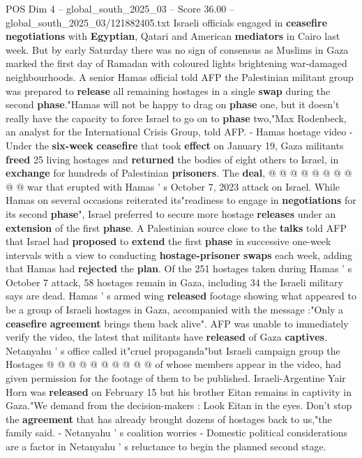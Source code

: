 \begin{textsample}{POS Dim 4 – global\_south\_2025\_03 – Score 36.00 – global\_south\_2025\_03/121882405.txt}
Israeli officials engaged in \textbf{ceasefire} \textbf{negotiations} with \textbf{Egyptian}, Qatari and American \textbf{mediators} in Cairo last week.
But by early Saturday there was no sign of consensus as Muslims in Gaza marked the first day of Ramadan with coloured lights brightening war-damaged neighbourhoods.
A senior Hamas official told AFP the Palestinian militant group was prepared to \textbf{release} all remaining hostages in a single \textbf{swap} during the second \textbf{phase}."Hamas will not be happy to drag on \textbf{phase} one, but it doesn't really have the capacity to force Israel to go on to \textbf{phase} two,"Max Rodenbeck, an analyst for the International Crisis Group, told AFP. - Hamas hostage video - Under the \textbf{six-week} \textbf{ceasefire} that took \textbf{effect} on January 19, Gaza militants \textbf{freed} 25 living hostages and \textbf{returned} the bodies of eight others to Israel, in \textbf{exchange} for hundreds of Palestinian \textbf{prisoners}.
The \textbf{deal}, @ @ @ @ @ @ @ @ @ @ war that erupted with Hamas ' s October 7, 2023 attack on Israel.
While Hamas on several occasions reiterated its"readiness to engage in \textbf{negotiations} for its second \textbf{phase}", Israel preferred to secure more hostage \textbf{releases} under an \textbf{extension} of the first \textbf{phase}.
A Palestinian source close to the \textbf{talks} told AFP that Israel had \textbf{proposed} to \textbf{extend} the first \textbf{phase} in successive one-week intervals with a view to conducting \textbf{hostage-prisoner} \textbf{swaps} each week, adding that Hamas had \textbf{rejected} the \textbf{plan}.
Of the 251 hostages taken during Hamas ' s October 7 attack, 58 hostages remain in Gaza, including 34 the Israeli military says are dead.
Hamas ' s armed wing \textbf{released} footage showing what appeared to be a group of Israeli hostages in Gaza, accompanied with the message :"Only a \textbf{ceasefire} \textbf{agreement} brings them back alive".
AFP was unable to immediately verify the video, the latest that militants have \textbf{released} of Gaza \textbf{captives}.
Netanyahu ' s office called it"cruel propaganda"but Israeli campaign group the Hostages @ @ @ @ @ @ @ @ @ @ of whose members appear in the video, had given permission for the footage of them to be published.
Israeli-Argentine Yair Horn was \textbf{released} on February 15 but his brother Eitan remains in captivity in Gaza."We demand from the decision-makers : Look Eitan in the eyes.
Don't stop the \textbf{agreement} that has already brought dozens of hostages back to us,"the family said. - Netanyahu ' s coalition worries - Domestic political considerations are a factor in Netanyahu ' s reluctance to begin the planned second stage.

\end{textsample}
